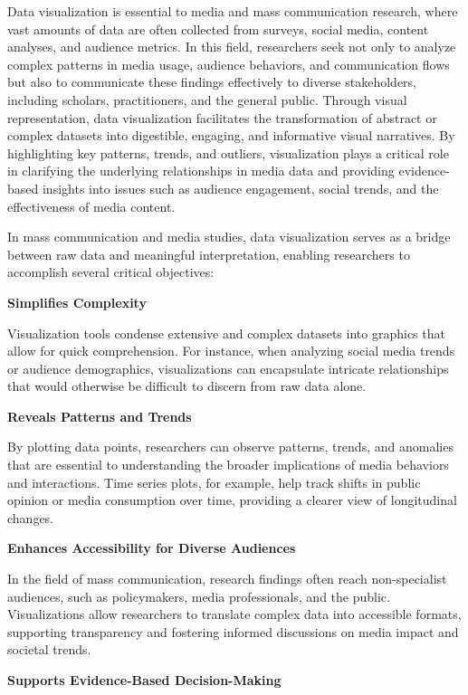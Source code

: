 \documentclass[
]{book}
\begin{document}
Data visualization is essential to media and mass communication research, where vast amounts of data are often collected from surveys, social media, content analyses, and audience metrics. In this field, researchers seek not only to analyze complex patterns in media usage, audience behaviors, and communication flows but also to communicate these findings effectively to diverse stakeholders, including scholars, practitioners, and the general public. Through visual representation, data visualization facilitates the transformation of abstract or complex datasets into digestible, engaging, and informative visual narratives. By highlighting key patterns, trends, and outliers, visualization plays a critical role in clarifying the underlying relationships in media data and providing evidence-based insights into issues such as audience engagement, social trends, and the effectiveness of media content.

In mass communication and media studies, data visualization serves as a bridge between raw data and meaningful interpretation, enabling researchers to accomplish several critical objectives:

\textbf{Simplifies Complexity}

Visualization tools condense extensive and complex datasets into graphics that allow for quick comprehension. For instance, when analyzing social media trends or audience demographics, visualizations can encapsulate intricate relationships that would otherwise be difficult to discern from raw data alone.

\textbf{Reveals Patterns and Trends}

By plotting data points, researchers can observe patterns, trends, and anomalies that are essential to understanding the broader implications of media behaviors and interactions. Time series plots, for example, help track shifts in public opinion or media consumption over time, providing a clearer view of longitudinal changes.

\textbf{Enhances Accessibility for Diverse Audiences}

In the field of mass communication, research findings often reach non-specialist audiences, such as policymakers, media professionals, and the public. Visualizations allow researchers to translate complex data into accessible formats, supporting transparency and fostering informed discussions on media impact and societal trends.

\textbf{Supports Evidence-Based Decision-Making}
\end{document}
